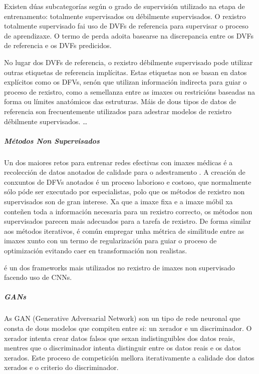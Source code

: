 Existen dúas subcategorías según o grado de supervisión utilizado na etapa de entrenamento: totalmente supervisados ou débilmente supervisados.
O rexistro totalmente supervisado fai uso de DVFs de referencia para supervisar o proceso de aprendizaxe.
 O termo de perda adoita basearse na discrepancia entre os DVFs de referencia e os DVFs predicidos.
 
No lugar dos DVFs de referencia, o rexistro débilmente supervisado pode utilizar outras etiquetas de referencia implícitas.
 Estas etiquetas non se basan en datos explícitos como os DFVs, senón que utilizan información indirecta para guiar o proceso de rexistro, como a semellanza entre as imaxes ou restricións baseadas na forma ou límites anatómicos das estruturas.
 Máis de dous tipos de datos de referencia son frecuentemente utilizados para adestrar modelos de rexistro débilmente supervisados. \cite{bharati2022deeplearningmedicalimage}
\dots

\subparagraph{Métodos Non Supervisados}
\label{subparagraph:Métodos Non Supervisados}

Un dos maiores retos para entrenar redes efectivas con imaxes médicas é a recolección de datos anotados de calidade para o adestramento \cite{medicalimageanalysis}.
A creación de conxuntos de DFVs anotados é un proceso laborioso e costoso, que normalmente sólo póde ser executado por especialistas, polo que os métodos de rexistro non supervisados son de gran interese.
Xa que a imaxe fixa e a imaxe móbil xa conteñen toda a información necesaria para un rexistro correcto, os métodos non supervisados parecen mais adecuados para a tarefa de rexistro.
De forma similar aos métodos iterativos, é común empregar unha métrica de similitude entre as imaxes xunto con un termo de regularización para guiar o proceso de optimización evitando caer en transformación non realistas.

\cite{Balakrishnan_2019voxelmorph} é un dos frameworks mais utilizados no rexistro de imaxes non supervisado facendo uso de CNNs.

\subparagraph{GANs}
\label{subparagraph:GANs}

As \gls{GAN} (Generative Adversarial Network) son un tipo de rede neuronal que consta de dous modelos que compiten entre si: un xerador e un discriminador. O xerador intenta crear datos falsos que sexan indistinguibles dos datos reais, mentres que o discriminador intenta distinguir entre os datos reais e os datos xerados. Este proceso de competición mellora iterativamente a calidade dos datos xerados e o criterio do discriminador.

